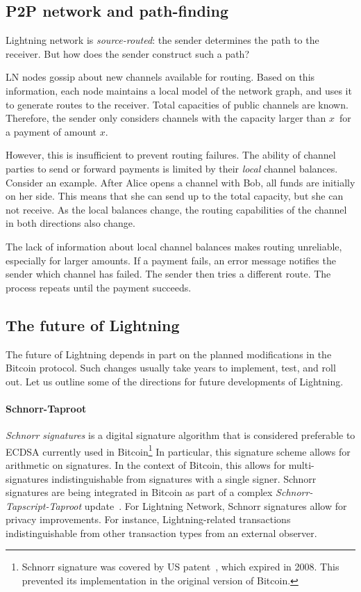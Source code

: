 \subsection{P2P network and path-finding}

Lightning network is \textit{source-routed}: the sender determines the path to the receiver.
But how does the sender construct such a path?

LN nodes gossip about new channels available for routing.
Based on this information, each node maintains a local model of the network graph, and uses it to generate routes to the receiver.
Total capacities of public channels are known.
Therefore, the sender only considers channels with the capacity larger than $x$~for a payment of amount $x$.

However, this is insufficient to prevent routing failures.
The ability of channel parties to send or forward payments is limited by their \textit{local} channel balances.
Consider an example.
After Alice opens a channel with Bob, all funds are initially on her side.
This means that she can send up to the total capacity, but she can not receive.
As the local balances change, the routing capabilities of the channel in both directions also change.

The lack of information about local channel balances makes routing unreliable, especially for larger amounts.
If a payment fails, an error message notifies the sender which channel has failed.
The sender then tries a different route.
The process repeats until the payment succeeds.


\subsection{The future of Lightning}

The future of Lightning depends in part on the planned modifications in the Bitcoin protocol.
Such changes usually take years to implement, test, and roll out.
Let us outline some of the directions for future developments of Lightning.

\paragraph{Schnorr-Taproot}

\textit{Schnorr signatures} is a digital signature algorithm that is considered preferable to ECDSA currently used in Bitcoin\footnote{Schnorr signature was covered by US patent~\cite{Schnorr1989}, which expired in 2008. This prevented its implementation in the original version of Bitcoin.}
In particular, this signature scheme allows for arithmetic on signatures.
In the context of Bitcoin, this allows for multi-signatures indistinguishable from signatures with a single signer.
Schnorr signatures are being integrated in Bitcoin as part of a complex \textit{Schnorr-Tapscript-Taproot} update~\cite{Hertig2020}.
For Lightning Network, Schnorr signatures allow for privacy improvements.
For instance, Lightning-related transactions indistinguishable from other transaction types from an external observer.

